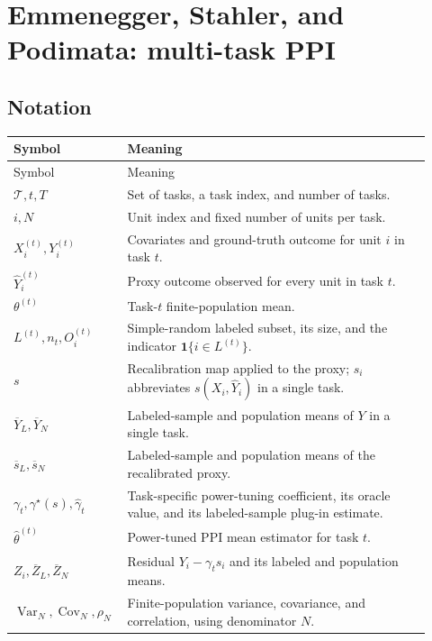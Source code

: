\documentclass[11pt]{article}
\newcommand{\Var}{\operatorname{Var}}
\newcommand{\Cov}{\operatorname{Cov}}
\newcommand{\ind}{\mathbf{1}}
\begin{document}
  \section{Emmenegger, Stahler, and Podimata: multi-task PPI}
  
  \subsection*{Notation}
  
  \begin{longtable}{>{\raggedright\arraybackslash}p{0.22\linewidth}
                    >{\raggedright\arraybackslash}p{0.70\linewidth}}
  \toprule
  Symbol & Meaning \\
  \midrule
  \endfirsthead
  \toprule
  Symbol & Meaning \\
  \midrule
  \endhead
  \(\mathcal T,t,T\) & Set of tasks, a task index, and number of tasks. \\
  \(i,N\) & Unit index and fixed number of units per task. \\
  \(X_i^{(t)},Y_i^{(t)}\) & Covariates and ground-truth outcome for unit \(i\)
  in task \(t\). \\
  \(\widehat Y_i^{(t)}\) & Proxy outcome observed for every unit in task \(t\). \\
  \(\theta^{(t)}\) & Task-\(t\) finite-population mean. \\
  \(L^{(t)},n_t,O_i^{(t)}\) & Simple-random labeled subset, its size, and the
  indicator \(\ind\{i\in L^{(t)}\}\). \\
  \(s\) & Recalibration map applied to the proxy; \(s_i\) abbreviates
  \(s(X_i,\widehat Y_i)\) in a single task. \\
  \(\overline Y_L,\overline Y_N\) & Labeled-sample and population means of
  \(Y\) in a single task. \\
  \(\overline s_L,\overline s_N\) & Labeled-sample and population means of the
  recalibrated proxy. \\
  \(\gamma_t,\gamma^\star(s),\widehat\gamma_t\) & Task-specific power-tuning
  coefficient, its oracle value, and its labeled-sample plug-in estimate. \\
  \(\widehat\theta^{(t)}\) & Power-tuned PPI mean estimator for task \(t\). \\
  \(Z_i,\overline Z_L,\overline Z_N\) & Residual \(Y_i-\gamma_t s_i\) and its
  labeled and population means. \\
  \(\Var_N,\Cov_N,\rho_N\) & Finite-population variance, covariance, and
  correlation, using denominator \(N\). \\

\end{longtable}
\end{document}
